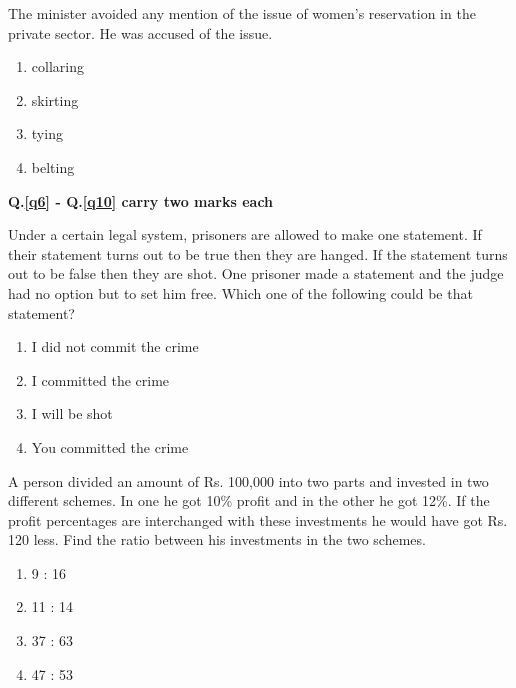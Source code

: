     \item The minister avoided any mention of the issue of women's reservation in the private sector. He was accused of \underline{\hspace{2cm}}the issue.
    \begin{enumerate}
        \item collaring
        \item skirting
        \item tying
        \item belting
    \end{enumerate}

    \textbf{Q.\ref{q6} - Q.\ref{q10} carry two marks each}

    \item \label{q6} Under a certain legal system, prisoners are allowed to make one statement. If their statement turns out to be true then they are hanged. If the statement turns out to be false then they are shot. One prisoner made a statement and the judge had no option but to set him free. Which one of the following could be that statement?
    \begin{enumerate}
        \item I did not commit the crime
        \item I committed the crime
        \item I will be shot
        \item You committed the crime
    \end{enumerate}

    \item \label{Q7} A person divided an amount of Rs. 100,000 into two parts and invested in two different schemes. In one he got 10\% profit and in the other he got 12\%. If the profit percentages are interchanged with these investments he would have got Rs. 120 less. Find the ratio between his investments in the two schemes.
    \begin{enumerate}
        \item 9 : 16
        \item 11 : 14
        \item 37 : 63
        \item 47 : 53
    \end{enumerate}

